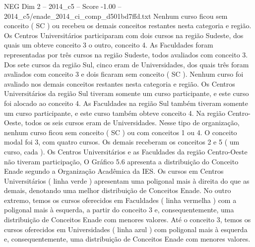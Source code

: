 \begin{textsample}{NEG Dim 2 – 2014\_c5 – Score -1.00 – 2014\_c5/enade\_2014\_ci\_comp\_d501bd7ffd.txt}
Nenhum curso ficou sem conceito ( SC ) ou recebeu os demais conceitos restantes nesta categoria e região.
Os Centros Universitários participaram com dois cursos na região Sudeste, dos quais um obteve conceito 3 o outro, conceito 4.
As Faculdades foram representadas por três cursos na região Sudeste, todos avaliados com conceito 3.
Dos sete cursos da região Sul, cinco eram de Universidades, dos quais três foram avaliados com conceito 3 e dois ficaram sem conceito ( SC ).
Nenhum curso foi avaliado nos demais conceitos restantes nesta categoria e região.
Os Centros Universitários da região Sul tiveram somente um curso participante, e este curso foi alocado ao conceito 4.
As Faculdades na região Sul também tiveram somente um curso participante, e este curso também obteve conceito 4.
Na região Centro-Oeste, todos os seis cursos eram de Universidades.
Nesse tipo de organização, nenhum curso ficou sem conceito ( SC ) ou com conceitos 1 ou 4.
O conceito modal foi 3, com quatro cursos.
Os demais receberam os conceitos 2 e 5 ( um curso, cada ).
Os Centros Universitários e as Faculdades da região Centro-Oeste não tiveram participação, O Gráfico 5.6 apresenta a distribuição do Conceito Enade segundo a Organização Acadêmica da IES.
Os cursos em Centros Universitários ( linha verde ) apresentam uma poligonal mais à direita do que as demais, denotando uma melhor distribuição de Conceitos Enade.
No outro extremo, temos os cursos oferecidos em Faculdades ( linha vermelha ) com a poligonal mais à esquerda, a partir do conceito 3 e, consequentemente, uma distribuição de Conceitos Enade com menores valores.
Até o conceito 3, temos os cursos oferecidos em Universidades ( linha azul ) com poligonal mais à esquerda e, consequentemente, uma distribuição de Conceitos Enade com menores valores.

\end{textsample}
